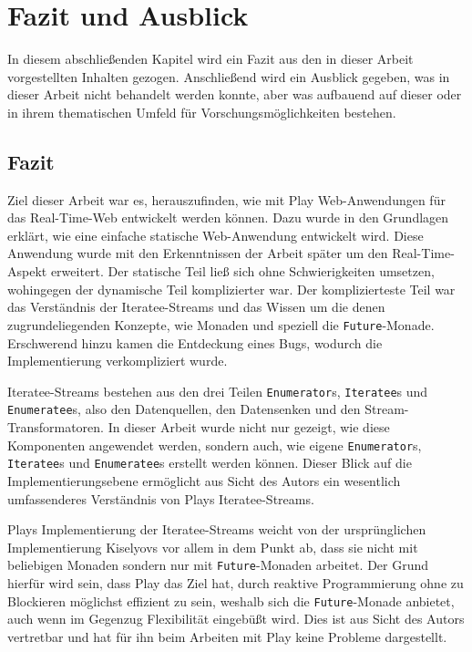 
\chapter{Fazit und Ausblick} %
\label{cha:fazit_und_ausblick}

In diesem abschließenden Kapitel wird ein Fazit aus den in dieser Arbeit vorgestellten Inhalten gezogen.
Anschließend wird ein Ausblick gegeben, was in dieser Arbeit nicht behandelt werden konnte, aber was aufbauend auf dieser oder in ihrem thematischen Umfeld für Vorschungsmöglichkeiten bestehen.

\section{Fazit} %
\label{sec:fazit}

Ziel dieser Arbeit war es, herauszufinden, wie mit Play Web-Anwendungen für das Real-Time-Web entwickelt werden können.
Dazu wurde in den Grundlagen erklärt, wie eine einfache statische Web-Anwendung entwickelt wird.
Diese Anwendung wurde mit den Erkenntnissen der Arbeit später um den Real-Time-Aspekt erweitert.
Der statische Teil ließ sich ohne Schwierigkeiten umsetzen, wohingegen der dynamische Teil komplizierter war.
Der komplizierteste Teil war das Verständnis der Iteratee-Streams und das Wissen um die denen zugrundeliegenden Konzepte, wie Monaden und speziell die \lstinline|Future|-Monade.
Erschwerend hinzu kamen die Entdeckung eines Bugs, wodurch die Implementierung verkompliziert wurde.

Iteratee-Streams bestehen aus den drei Teilen \lstinline|Enumerator|s, \lstinline|Iteratee|s und \lstinline|Enumeratee|s, also den Datenquellen, den Datensenken und den Stream-Transformatoren.
In dieser Arbeit wurde nicht nur gezeigt, wie diese Komponenten angewendet werden, sondern auch, wie eigene \lstinline|Enumerator|s, \lstinline|Iteratee|s und \lstinline|Enumeratee|s erstellt werden können.
Dieser Blick auf die Implementierungsebene ermöglicht aus Sicht des Autors ein wesentlich umfassenderes Verständnis von Plays Iteratee-Streams.

Plays Implementierung der Iteratee-Streams weicht von der ursprünglichen Implementierung Kiselyovs vor allem in dem Punkt ab, dass sie nicht mit beliebigen Monaden sondern nur mit \lstinline|Future|-Monaden arbeitet.
Der Grund hierfür wird sein, dass Play das Ziel hat, durch reaktive Programmierung ohne zu Blockieren möglichst effizient zu sein, weshalb sich die \lstinline|Future|-Monade anbietet, auch wenn im Gegenzug Flexibilität eingebüßt wird.
Dies ist aus Sicht des Autors vertretbar und hat für ihn beim Arbeiten mit Play keine Probleme dargestellt.

